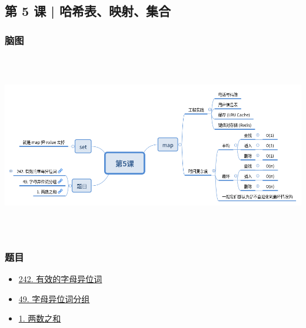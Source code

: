 \subsection{第 5 课 | 哈希表、映射、集合}

\subsubsection{脑图}

\includegraphics[width=170mm,height=80mm]{images/第5课.png}

\subsubsection{题目}

\begin{itemize}
\item \hyperref[leetcode:242]{242. 有效的字母异位词}
\item \hyperref[leetcode:49]{49. 字母异位词分组}
\item \hyperref[leetcode:1]{1. 两数之和}
\end{itemize}
